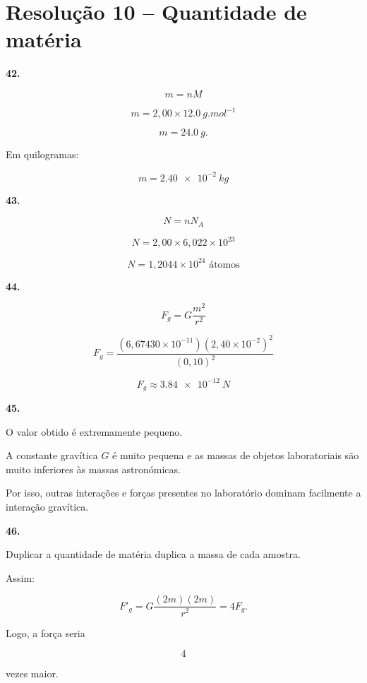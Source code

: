 \documentclass[11pt,a4paper]{article}
\begin{document}
	\section*{Resolução 10 -- Quantidade de matéria}
	
	\begin{solucaobox}[Questões 42--46]
		
		\textbf{42.}
		
		\[
		m=nM
		\]
		
		\[
		m=
		2{,}00\times
		\SI{12.0}{g.mol^{-1}}
		\]
		
		\[
		m=\SI{24.0}{g}.
		\]
		
		Em quilogramas:
		
		\[
		\boxed{
			m=\SI{2.40e-2}{kg}
		}
		\]
		
		\vspace{3mm}
		
		\textbf{43.}
		
		\[
		N=nN_A
		\]
		
		\[
		N=
		2{,}00
		\times
		6{,}022\times10^{23}
		\]
		
		\[
		\boxed{
			N=
			1{,}2044\times10^{24}
			\text{ átomos}
		}
		\]
		
		\vspace{3mm}
		
		\textbf{44.}
		
		\[
		F_g=
		G\frac{m^2}{r^2}
		\]
		
		\[
		F_g=
		\frac{
			(6{,}67430\times10^{-11})
			(2{,}40\times10^{-2})^2
		}{
			(0{,}10)^2
		}
		\]
		
		\[
		\boxed{
			F_g\approx\SI{3.84e-12}{N}
		}
		\]
		
		\vspace{3mm}
		
		\textbf{45.}
		
		O valor obtido é extremamente pequeno.
		
		A constante gravítica $G$ é muito pequena e as massas de objetos
		laboratoriais são muito inferiores às massas astronómicas.
		
		Por isso, outras interações e forças presentes no laboratório dominam
		facilmente a interação gravítica.
		
		\vspace{3mm}
		
		\textbf{46.}
		
		Duplicar a quantidade de matéria duplica a massa de cada amostra.
		
		Assim:
		
		\[
		F'_g=
		G\frac{(2m)(2m)}{r^2}
		=
		4F_g.
		\]
		
		Logo, a força seria
		
		\[
		\boxed{4}
		\]
		
		vezes maior.
		
	\end{solucaobox}
	
\end{document}
